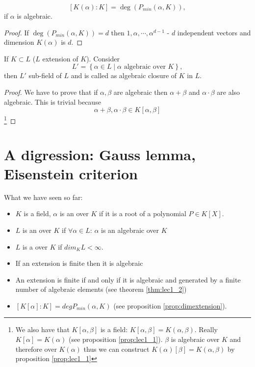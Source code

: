 \begin{proposition}
  \[
  \left[K\left(\alpha\right) : K\right] =
  \deg\left(P_{min}\left(\alpha, K\right)\right),
  \]
  if $\alpha$ is algebraic.
  \begin{proof}
    If $\deg\left(P_{min}\left(\alpha, K\right)\right) = d$ then $1, \alpha,
    \cdots, \alpha^{d-1}$ - $d$ independent vectors and dimension
    $K\left(\alpha\right)$ is $d$.
  \end{proof}
  \label{prop:dimextension}
\end{proposition}

\begin{proposition}
  If $K \subset L$ ($L$ extension of $K$). Consider
  \[
  L' = \left\{
  \alpha \in L \mid \alpha \mbox{ algebraic over } K
  \right\},
  \]
  then $L'$ sub-field of $L$ and is called as algebraic closure of $K$
  in $L$.
  \begin{proof}
    We have to prove that if $\alpha, \beta$ are algebraic then
    $\alpha + \beta$ and $\alpha \cdot \beta$ are also algebraic. This
    is trivial  because
    \[
    \alpha + \beta, \alpha \cdot \beta \in K\left[\alpha, \beta\right]
    \]
    \footnote{
      We also have that $K\left[\alpha, \beta\right]$ is a field:
      $K\left[\alpha, \beta\right]
      = K\left(\alpha, \beta\right)$.
      Really
      $K\left[\alpha\right] =
      K\left(\alpha\right)$ (see proposition
      \ref{prop:lec1_1}). $\beta$ is algebraic over $K$ and 
      therefore over $K\left(\alpha\right)$ thus we can construct
      $K\left(\alpha\right)\left[\beta\right] = K\left(\alpha, \beta\right)$
      by proposition \ref{prop:lec1_1}
    }
  \end{proof}
\end{proposition}


\section{A digression: Gauss lemma, Eisenstein criterion}

What we have seen so far:

\begin{itemize}
\item $K$ is a field, $\alpha$ is an 
  over $K$ if it is a root of a polynomial $P \in K\left[X\right]$.
\item $L$ is an  over $K$ if
  $\forall \alpha \in L$: $\alpha$ is an algebraic over $K$
\item $L$ is a  over $K$ if $dim_K L <
  \infty$.
\item If an extension is finite then it is algebraic
\item An extension is finite if and only if it is algebraic and
  generated by a finite number of algebraic elements (see theorem
  \ref{thm:lec1_2})
\item $\left[K\left[\alpha\right]:K\right] =
  deg P_{min}\left(\alpha, K\right)$ (see proposition
  \ref{prop:dimextension}). 
\end{itemize}

